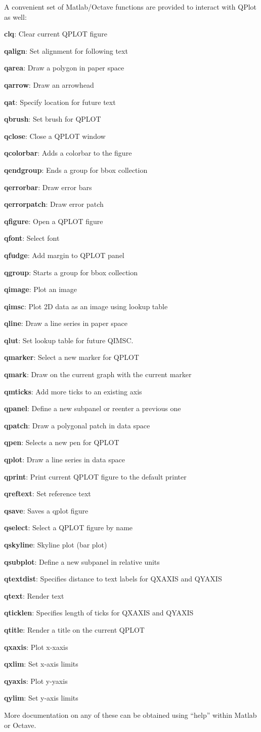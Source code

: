 \documentclass[11pt]{article}
\def\matlab#1#2{{\bf #1}: #2\par}
\begin{document}
A convenient set of Matlab/Octave functions are provided to interact
with QPlot as well:\medskip

\matlab{clq}{Clear current QPLOT figure}
\matlab{qalign}{Set alignment for following text}
\matlab{qarea}{Draw a polygon in paper space}
\matlab{qarrow}{Draw an arrowhead}
\matlab{qat}{Specify location for future text}
\matlab{qbrush}{Set brush for QPLOT}
\matlab{qclose}{Close a QPLOT window}
\matlab{qcolorbar}{Adds a colorbar to the figure}
\matlab{qendgroup}{Ends a group for bbox collection}
\matlab{qerrorbar}{Draw error bars}
\matlab{qerrorpatch}{Draw error patch}
\matlab{qfigure}{Open a QPLOT figure}
\matlab{qfont}{Select font }
\matlab{qfudge}{Add margin to QPLOT panel}
\matlab{qgroup}{Starts a group for bbox collection}
\matlab{qimage}{Plot an image}
\matlab{qimsc}{Plot 2D data as an image using lookup table}
\matlab{qline}{Draw a line series in paper space}
\matlab{qlut}{Set lookup table for future QIMSC.}
\matlab{qmarker}{Select a new marker for QPLOT}
\matlab{qmark}{Draw on the current graph with the current marker}
\matlab{qmticks}{Add more ticks to an existing axis}
\matlab{qpanel}{Define a new subpanel or reenter a previous one}
\matlab{qpatch}{Draw a polygonal patch in data space}
\matlab{qpen}{Selects a new pen for QPLOT}
\matlab{qplot}{Draw a line series in data space}
\matlab{qprint}{Print current QPLOT figure to the default printer}
\matlab{qreftext}{Set reference text}
\matlab{qsave}{Saves a qplot figure}
\matlab{qselect}{Select a QPLOT figure by name}
\matlab{qskyline}{Skyline plot (bar plot)}
\matlab{qsubplot}{Define a new subpanel in relative units}
\matlab{qtextdist}{Specifies distance to text labels for QXAXIS and QYAXIS}
\matlab{qtext}{Render text }
\matlab{qticklen}{Specifies length of ticks for QXAXIS and QYAXIS}
\matlab{qtitle}{Render a title on the current QPLOT}
\matlab{qxaxis}{Plot x-xaxis}
\matlab{qxlim}{Set x-axis limits}
\matlab{qyaxis}{Plot y-yaxis}
\matlab{qylim}{Set y-axis limits}\medskip

More documentation on any of these can be obtained using ``help''
within Matlab or Octave.
\end{document}
